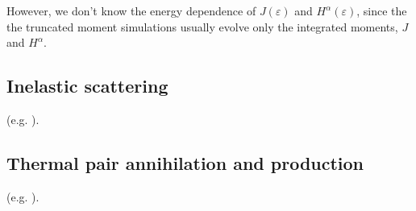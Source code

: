 \documentclass[aps,floatfix,prd,superscriptaddress,twocolumn]{revtex4-1}
\begin{document}
However, we don't know the energy dependence of $J(\varepsilon)$ and
$H^\alpha(\varepsilon)$,
since the the truncated moment simulations usually evolve only the integrated
moments, $J$ and $H^\alpha$.

\subsection{Inelastic scattering}
\label{ssec:sources_si}
(e.g. \cite[Eqn.~A6]{brue1985-core_collapse}).

\subsection{Thermal pair annihilation and production}
\label{ssec:sources_pp}
(e.g. \cite[Eqn.~A9]{brue1985-core_collapse}).


\end{document}
